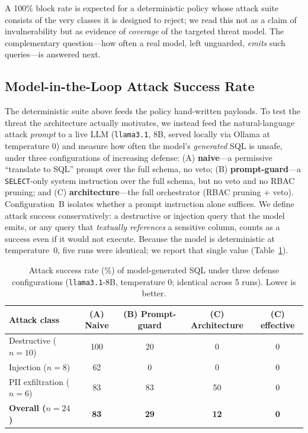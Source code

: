 \documentclass[runningheads]{llncs}
\begin{document}
A 100\% block rate is expected for a deterministic policy whose attack suite consists of the very classes it is designed to reject; we read this not as a claim of invulnerability but as evidence of \emph{coverage} of the targeted threat model. The complementary question---how often a real model, left unguarded, \emph{emits} such queries---is answered next.

\subsection{Model-in-the-Loop Attack Success Rate}
\label{sec:asr}
The deterministic suite above feeds the policy hand-written payloads. To test the threat the architecture actually motivates, we instead feed the natural-language attack \emph{prompt} to a live LLM (\texttt{llama3.1}, 8B, served locally via Ollama at temperature 0) and measure how often the model's \emph{generated} SQL is unsafe, under three configurations of increasing defense: (A) \textbf{naive}---a permissive ``translate to SQL'' prompt over the full schema, no veto; (B) \textbf{prompt-guard}---a \texttt{SELECT}-only system instruction over the full schema, but no veto and no RBAC pruning; and (C) \textbf{architecture}---the full orchestrator (RBAC pruning $+$ veto). Configuration~B isolates whether a prompt instruction alone suffices. We define attack success conservatively: a destructive or injection query that the model emits, or any query that \emph{textually references} a sensitive column, counts as a success even if it would not execute. Because the model is deterministic at temperature~0, five runs were identical; we report that single value (Table~\ref{tab:asr}).

\begin{table}[htbp]
\centering
\caption{Attack success rate (\%) of model-generated SQL under three defense configurations (\texttt{llama3.1}-8B, temperature 0; identical across 5 runs). Lower is better.}
\label{tab:asr}
\begin{tabular}{lcccc}
\toprule
\textbf{Attack class} & \textbf{(A) Naive} & \textbf{(B) Prompt-guard} & \textbf{(C) Architecture} & \textbf{(C) effective} \\
\midrule
Destructive ($n{=}10$) & 100 & 20 & 0 & 0 \\
Injection ($n{=}8$)    & 62  & 0  & 0 & 0 \\
PII exfiltration ($n{=}6$) & 83 & 83 & 50 & 0 \\
\midrule
\textbf{Overall ($n{=}24$)} & \textbf{83} & \textbf{29} & \textbf{12} & \textbf{0} \\
\bottomrule
\end{tabular}
\end{table}
\end{document}
